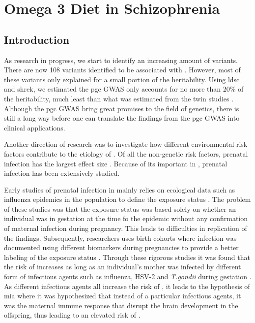 \chapter{Omega 3 Diet in Schizophrenia}
\section{Introduction}
As research in  progress, we start to identify an increasing amount of variants. 
There are now 108 variants identified to be associated with  \citep{Ripke2013}.
However, most of these variants only explained for a small portion of the heritability.
Using \gls{ldsc} and \gls{shrek}, we estimated the \gls{pgc}  \gls{GWAS} only accounts for no more than 20\% of the heritability, much least than what was estimated from the twin studies \citep{Lichtenstein2009,Sullivan2003}.
Although the \gls{pgc}  \gls{GWAS} bring great promises to the field of  genetics, there is still a long way before one can translate the findings from the \gls{pgc}  \gls{GWAS} into clinical applications.

Another direction of  research was to investigate how different environmental risk factors contribute to the etiology of .
Of all the non-genetic risk factors, prenatal infection has the largest effect size \citep{Sullivan2005}.
Because of its important in , prenatal infection has been extensively studied.

Early studies of prenatal infection in  mainly relies on ecological data such as influenza epidemics in the population to define the exposure status \citep{Brown2010}.
The problem of these studies was that the exposure status was based solely on whether an individual was in gestation at the time fo the epidemic without any confirmation of maternal infection during pregnancy.
This leads to difficulties in replication of the findings.
Subsequently, researchers uses birth cohorts where infection was documented using different biomarkers during pregnancies to provide a better labeling of the exposure status \citep{Brown2010}.
Through these rigorous studies it was found that the risk of  increases as long as an individual's mother was infected by different form of infectious agents such as influenza, HSV-2 and \textit{T.gondii} during gestation \citep{Brown2010}.
As different infectious agents all increase the risk of , it leads to the hypothesis of \gls{mia} \citep{Brown2010} where it was hypothesized that instead of a particular infectious agents, it was the maternal immune response that disrupt the brain development in the offspring, thus leading to an elevated risk of .

